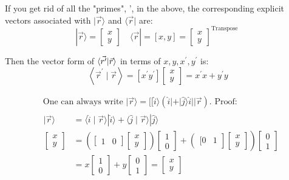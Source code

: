 \documentclass{article}
\begin{document}
If you get rid of all the "primes", ', in the above, the corresponding explicit vectors associated with $|\vec{r}\rangle$ and $\langle\vec{r}|$ are:
$$
|\vec{r}\rangle=\left[\begin{array}{l}
x \\
y
\end{array}\right] \quad\langle\vec{r}|=[x, y]=\left[\begin{array}{l}
x \\
y
\end{array}\right]^{\text {Transpose }}
$$

Then the vector form of $\braket{\vec{r'} | \vec{r}}$ in terms of $x, y, x^{\prime}, y^{\prime}$ is:
$$
\left\langle\vec{r}^{\prime} \mid \vec{r}\right\rangle=\left[x^{\prime} y^{\prime}\right]\left[\begin{array}{l}
x \\
y
\end{array}\right]=x^{\prime} x+y^{\prime} y
$$

$$
\begin{aligned}
&\text { One can always write }|\vec{r}\rangle=[[\hat{i}\rangle(\hat{i}|+| \hat{j}\rangle \hat{i}|| \vec{r}) \text {. Proof: } \\
&\begin{aligned}
|\vec{r}\rangle &=\langle\hat{i} \mid \vec{r}\rangle|\hat{i}\rangle+\langle\hat{j} \mid \vec{r}\rangle|\hat{j}\rangle \\
\left[\begin{array}{l}
x \\
y
\end{array}\right] &\left.=\left(\left[\begin{array}{ll}
1 & 0
\end{array}\right]\left[\begin{array}{l}
x \\
y
\end{array}\right]\right)\left[\begin{array}{l}
1 \\
0
\end{array}\right]+\left(\begin{array}{ll}
[0 & 1
\end{array}\right]\left[\begin{array}{l}
x \\
y
\end{array}\right]\right)\left[\begin{array}{l}
0 \\
1
\end{array}\right] \\
&=x\left[\begin{array}{l}
1 \\
0
\end{array}\right]+y\left[\begin{array}{l}
0 \\
1
\end{array}\right]=\left[\begin{array}{l}
x \\
y
\end{array}\right]
\end{aligned}
\end{aligned}
$$
\end{document}
